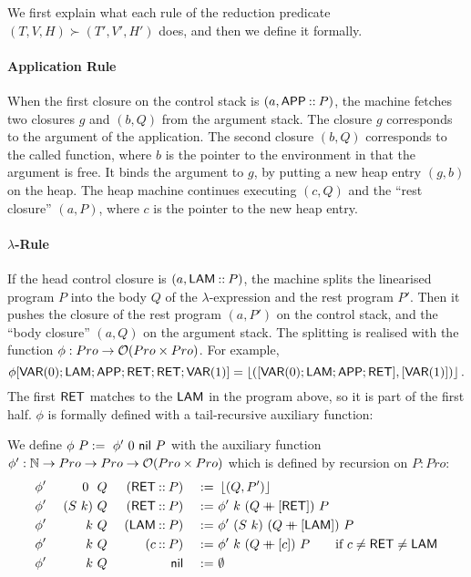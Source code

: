 We first explain what each rule of the reduction predicate $(T,V,H) \succ (T',V',H')$ does, and then we define it formally.


\paragraph{Application Rule}
When the first closure on the control stack is $(a, \mathsf{APP} \mathbin{::} P)$, the machine fetches two closures $g$ and $(b,Q)$ from the argument stack.  The
closure $g$ corresponds to the argument of the application.  The second closure $(b,Q)$ corresponds to the called function, where $b$ is the pointer
to the environment in that the argument is free.  It binds the argument to $g$, by putting a new heap entry $(g,b)$ on the heap.  The heap machine
continues executing $(c,Q)$ and the ``rest closure'' $(a,P)$, where $c$ is the pointer to the new heap entry.


\paragraph{$\lambda$-Rule}
If the head control closure is $(a, \mathsf{LAM} \mathbin{::} P)$, the machine splits the linearised program $P$ into the body $Q$ of the $\lambda$-expression
and the rest program $P'$.  Then it pushes the closure of the rest program $(a,P')$ on the control stack, and the ``body closure'' $(a,Q)$ on the
argument stack.  The splitting is realised with the function $\phi : Pro \rightarrow \mathcal{O}(Pro \times Pro)$.  For example, {\small
  \[
    \phi[\mathsf{VAR}(0); \mathsf{LAM}; \mathsf{APP}; \mathsf{RET}; \mathsf{RET}; \mathsf{VAR}(1)] = \left\lfloor {([\ensuremath{\mathsf{VAR}}(0); \ensuremath{\mathsf{LAM}}; \ensuremath{\mathsf{APP}}; \ensuremath{\mathsf{RET}}], [\ensuremath{\mathsf{VAR}}(1)])} \right\rfloor.
  \]
}%
The first $\mathsf{RET}$ matches to the $\mathsf{LAM}$ in the program above, so it is part of the first half.  $\phi$ is formally defined with a
tail-recursive auxiliary function:
\begin{definition}[$\phi$][jumpTarget]
  \label{def:jumpTarget}
  We define $\phi~P :=~ \phi'~0~\mathsf{nil}~P$ with the auxiliary function $\phi' : \mathbb{N} \rightarrow Pro \rightarrow Pro \rightarrow \mathcal{O}(Pro \times Pro)$ which is defined by
  recursion on $P:Pro$:
  \begin{alignat*}{4}
    &\phi'&~0~   &~Q&~(\mathsf{RET} \mathbin{::} P) &&~:=~& \left\lfloor {(Q,P')} \right\rfloor \\
    &\phi'&~(S~k)&~Q&~(\mathsf{RET} \mathbin{::} P) &&~:=~& \phi'~k~(Q \mathbin{+\mkern-10mu+} [\mathsf{RET}])~P \\
    &\phi'&~k    &~Q&~(\mathsf{LAM} \mathbin{::} P) &&~:=~& \phi'~(S~k)~(Q \mathbin{+\mkern-10mu+} [\mathsf{LAM}])~P \\
    &\phi'&~k    &~Q&~(c        \mathbin{::} P) &&~:=~& \phi'~k~(Q \mathbin{+\mkern-10mu+} [c])~P \qquad \text{if $c \neq \mathsf{RET} \neq \mathsf{LAM}$} \\
    &\phi'&~k    &~Q&~              \mathsf{nil} &&~:=~& \emptyset
  \end{alignat*}
\end{definition}


